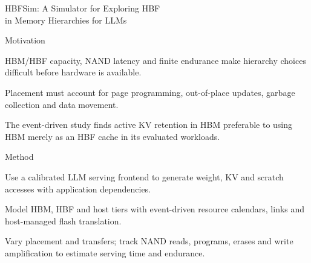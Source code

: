\begin{frame}[t]{HBFSim: A Simulator for Exploring HBF\\in Memory Hierarchies for LLMs}
\vspace{.02cm}
\begin{minipage}[t][3.25cm][t]{\linewidth}
\begin{summarysection}{Motivation}
\item {} HBM/HBF capacity, NAND latency and finite endurance make hierarchy choices difficult before hardware is available.
\item {} Placement must account for page programming, out-of-place updates, garbage collection and data movement.
\item {} The event-driven study finds active KV retention in HBM preferable to using HBM merely as an HBF cache in its evaluated workloads.
\end{summarysection}
\end{minipage}
\vspace{.18cm}
\begin{summarysection}{Method}
\item {} Use a calibrated LLM serving frontend to generate weight, KV and scratch accesses with application dependencies.
\item {} Model HBM, HBF and host tiers with event-driven resource calendars, links and host-managed flash translation.
\item {} Vary placement and transfers; track NAND reads, programs, erases and write amplification to estimate serving time and endurance.
\end{summarysection}
\end{frame}
\begingroup
{}
